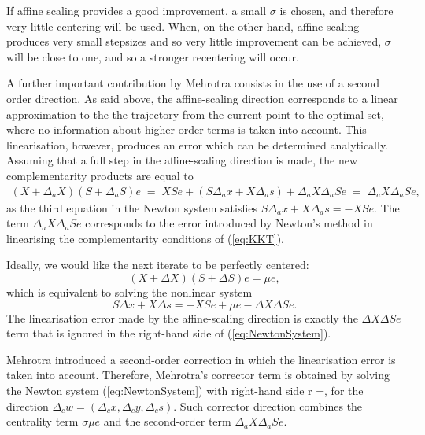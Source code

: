 If affine scaling provides a good improvement, a small $\sigma$ 
is chosen, and therefore very little centering will be used. When, 
on the other hand, affine scaling produces very small stepsizes 
and so very little improvement can be achieved, $\sigma$ will be 
close to one, and so a stronger recentering will occur.

A further important contribution by Mehrotra consists in the 
use of a second order direction. As said above, the affine-scaling direction 
corresponds to a linear approximation to the the trajectory from 
the current point to the optimal set, where no information about 
higher-order terms is taken into account. This linearisation, 
however, produces an error which can be determined analytically.
%
Assuming that a full step in the affine-scaling direction is made, 
the new complementarity products are equal to
%
\begin{eqnarray*}
  (X + \Delta_a X) (S + \Delta_a S) e 
   \;=\; XSe + (S \Delta_a x + X \Delta_a s) + \Delta_a X \Delta_a S e
   \;=\; \Delta_a X \Delta_a S e,
\end{eqnarray*}
%
as the third equation in the Newton system satisfies 
$S \Delta_a x + X \Delta_a s = -XSe.$
%
The term $\Delta_a X \Delta_a S e$ corresponds to the error introduced
by Newton's method in linearising the complementarity conditions of 
(\ref{eq:KKT}).

Ideally, we would like the next iterate to be perfectly centered: 
\[
  (X+\Delta X)(S+\Delta S)e=\mu e,
\]
which is equivalent to solving the nonlinear system
\[
  S\Delta x + X\Delta s = -XSe +\mu e - \Delta X\Delta Se.
\]
The linearisation error made by the affine-scaling direction is exactly 
the $\Delta X\Delta Se$ term that is ignored in the right-hand side
of (\ref{eq:NewtonSystem}).

Mehrotra introduced a second-order correction in which the 
linearisation error is taken into account. Therefore, 
Mehrotra's corrector term is obtained by solving the Newton system 
(\ref{eq:NewtonSystem}) with right-hand side
\be \label{eq:MehrotraRhs}
r =,
\ee
for the direction $\Delta_c w = (\Delta_c x,\Delta_c y,\Delta_c s)$.
Such corrector direction combines the centrality term $\sigma \mu e$
and the second-order term $\Delta_a X\Delta_a Se$.

